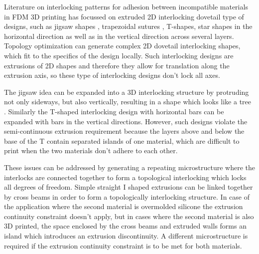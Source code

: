 Literature on interlocking patterns for adhesion between incompatible materials in FDM 3D printing has focussed on extruded 2D interlocking dovetail type of designs,
such as jigsaw shapes \cite{malik2017}, trapezoidal sutures \cite{Li2013}, T-shapes\cite{Ribeiro2019,mustafa2021development}, star shapes \cite{Wang2021} in the horizontal direction
as well as in the vertical direction across several layers\cite{debora2020}.
Topology optimization can generate complex 2D dovetail interlocking shapes, which fit to the specifics of the design locally\cite{aharoni2021}.
Such interlocking designs are extrusions of 2D shapes and therefore they allow for translation along the extrusion axis, so these type of interlocking designs don't lock all axes.

The jigsaw idea can be expanded into a 3D interlocking structure by protruding not only sideways, but also vertically, resulting in a shape which looks like a tree \cite{gouker2006manufacturing}.
Similarly the T-shaped interlocking design with horizontal bars can be expanded with bars in the vertical directions.
However, such designs violate the semi-continuous extrusion requirement because the layers above and below the base of the T contain separated islands of one material, 
which are difficult to print when the two materials don't adhere to each other.

These issues can be addressed by generating a repeating microstructure where the interlocks are connected together to form a topological interlocking which locks all degrees of freedom.
Simple straight I shaped extrusions can be linked together by cross beams in order to form a topologically interlocking structure\cite{Rossing2020}.
In case of the application where the second material is overmolded silicone the extrusion continuity constraint doesn't apply,
but in cases where the second material is also 3D printed, the space enclosed by the cross beams and extruded walls forms an island which introduces an extrusion discontinuity.
A different microstructure is required if the extrusion continuity constraint is to be met for both materials.



